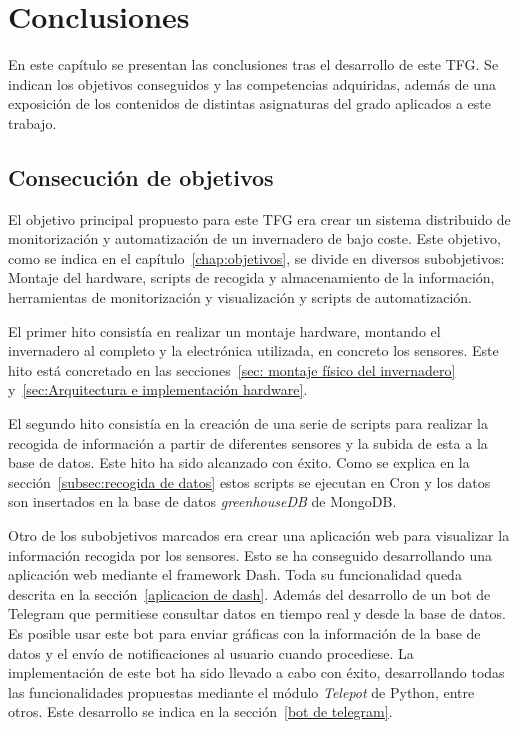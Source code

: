 \documentclass[a4paper, 12pt, oneside]{book}
\begin{document}

\cleardoublepage
\chapter{Conclusiones}
\label{chap:conclusiones}
En este capítulo se presentan las conclusiones tras el desarrollo de este TFG. Se indican los objetivos conseguidos y las competencias adquiridas, además de una exposición de los contenidos de distintas asignaturas del grado aplicados a este trabajo.

\section{Consecución de objetivos}
\label{sec:consecución de objetivos}
El objetivo principal propuesto para este TFG era crear un sistema distribuido de monitorización y automatización de un invernadero de bajo coste. Este objetivo, como se indica en el capítulo~\ref{chap:objetivos}, se divide en diversos subobjetivos: Montaje del hardware, scripts de recogida y almacenamiento de la información, herramientas de monitorización y visualización y scripts de automatización.

El primer hito consistía en realizar un montaje hardware, montando el invernadero al completo y la electrónica utilizada, en concreto los sensores. Este hito está concretado en las secciones~\ref{sec: montaje físico del invernadero} y~\ref{sec:Arquitectura e implementación hardware}.

El segundo hito consistía en la creación de una serie de scripts para realizar la recogida de información a partir de diferentes sensores y la subida de esta a la base de datos. Este hito ha sido alcanzado con éxito. Como se explica en la sección~\ref{subsec:recogida de datos} estos scripts se ejecutan en Cron y los datos son insertados en la base de datos \textit{greenhouseDB} de MongoDB.

Otro de los subobjetivos marcados era crear una aplicación web para visualizar la información recogida por los sensores. Esto se ha conseguido desarrollando una aplicación web mediante el framework Dash. Toda su funcionalidad queda descrita en la sección~\ref{aplicacion de dash}.
Además del desarrollo de un bot de Telegram que permitiese consultar datos en tiempo real y desde la base de datos. Es posible usar este bot para enviar gráficas con la información de la base de datos y el envío de notificaciones al usuario cuando procediese. La implementación de este bot ha sido llevado a cabo con éxito, desarrollando todas las funcionalidades propuestas mediante el módulo \textit{Telepot} de Python, entre otros. Este desarrollo se indica en la sección~\ref{bot de telegram}.
\end{document}
